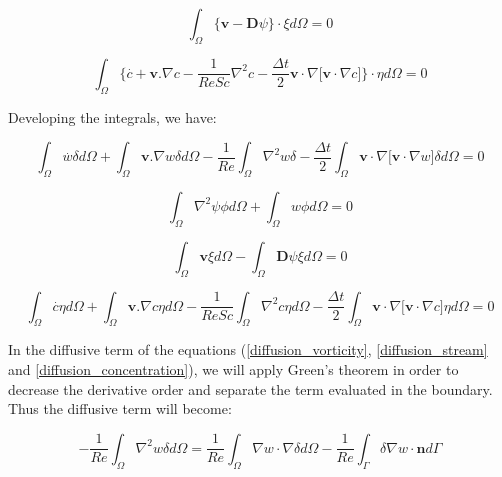 \begin{equation}
 \int_{\Omega} \big\{ \textbf{v} - \textbf{D}\psi \big\} \cdot \xi d\Omega = 0
\end{equation}

\begin{equation}
 \int_{\Omega} \Bigg\{ 
 \overset{.}{c} + \textbf{v}.\nabla c 
 - \frac{1}{\textit{ReSc}} \nabla^2 c 
 - \frac{\Delta t}{2} \textbf{v} \cdot \nabla \big[ \textbf{v} \cdot \nabla c \big]
 \Bigg\} \cdot \eta d\Omega = 0
\end{equation}



\noindent
Developing the integrals, we have:

\begin{equation} \label{diffusion_vorticity} 
   \int_{\Omega} \overset{.}{w} \delta d\Omega 
 + \int_{\Omega} \textbf{v}.\nabla w \delta d\Omega 
 - \frac{1}{\textit{Re}} \int_{\Omega} \nabla^2 w \delta 
 - \frac{\Delta t}{2} \int_{\Omega} \textbf{v} \cdot \nabla \big[ \textbf{v} \cdot \nabla w \big] \delta d\Omega
 = 0
\end{equation}

\begin{equation} \label{diffusion_stream}
   \int_{\Omega} \nabla^2 \psi \phi d\Omega
 + \int_{\Omega} w \phi d\Omega = 0
\end{equation}

\begin{equation}
   \int_{\Omega} \textbf{v} \xi d\Omega
 - \int_{\Omega} \textbf{D}\psi \xi d\Omega = 0
\end{equation}

\begin{equation} \label{diffusion_concentration} 
   \int_{\Omega} \overset{.}{c} \eta d\Omega
 + \int_{\Omega} \textbf{v}.\nabla c \eta d\Omega
 - \frac{1}{\textit{ReSc}} \int_{\Omega} \nabla^2 c \eta d\Omega 
 - \frac{\Delta t}{2} \int_{\Omega} \textbf{v} \cdot \nabla \big[ \textbf{v} \cdot \nabla c \big] \eta d\Omega
 = 0
\end{equation}

\medskip
In the diffusive term of the equations (\ref{diffusion_vorticity}, \ref{diffusion_stream} and \ref{diffusion_concentration}),
we will apply Green's theorem in order to decrease 
the derivative order and separate the term evaluated in the boundary. 
Thus the diffusive term will become:

\begin{equation} \label{diffusion2_vorticity} 
 - \frac{1}{\textit{Re}} \int_{\Omega} \nabla^2 w \delta d\Omega
 = \frac{1}{\textit{Re}} \int_{\Omega} \nabla w \cdot \nabla \delta d\Omega
 - \frac{1}{\textit{Re}} \int_{\Gamma} \delta \nabla w \cdot \textbf{n} d\Gamma
\end{equation}

